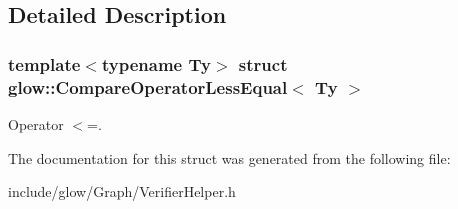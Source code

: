 \subsection{Detailed Description}
\subsubsection*{template$<$typename Ty$>$\newline
struct glow\+::\+Compare\+Operator\+Less\+Equal$<$ Ty $>$}

Operator $<$=. 

The documentation for this struct was generated from the following file\+:\begin{DoxyCompactItemize}
\item 
include/glow/\+Graph/Verifier\+Helper.\+h\end{DoxyCompactItemize}
